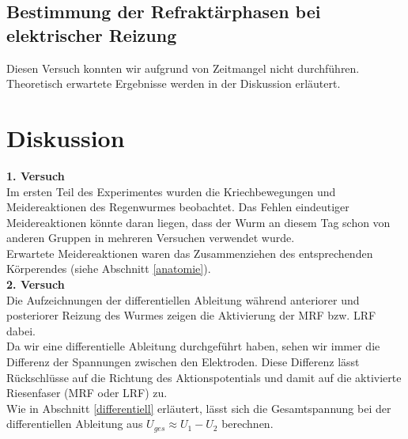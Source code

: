 \documentclass[11pt]{article}
\begin{document}

\subsection{Bestimmung der Refraktärphasen bei elektrischer Reizung}
Diesen Versuch konnten wir aufgrund von Zeitmangel nicht durchführen. Theoretisch erwartete Ergebnisse werden in der Diskussion erläutert.

\section{Diskussion}

\textbf{1. Versuch} \\
Im ersten Teil des Experimentes wurden die Kriechbewegungen und Meidereaktionen des Regenwurmes beobachtet. 
Das Fehlen eindeutiger Meidereaktionen könnte daran liegen, dass der Wurm an diesem Tag schon von anderen Gruppen in mehreren Versuchen verwendet wurde. \\
Erwartete Meidereaktionen waren das Zusammenziehen des entsprechenden Körperendes (siehe Abschnitt \ref{anatomie}). \\

\textbf{2. Versuch}\\
Die Aufzeichnungen der differentiellen Ableitung während anteriorer und posteriorer Reizung des Wurmes zeigen die Aktivierung der MRF bzw. LRF dabei. \\
Da wir eine differentielle Ableitung durchgeführt haben, sehen wir immer die Differenz der Spannungen zwischen den Elektroden. Diese Differenz lässt Rückschlüsse auf die Richtung des Aktionspotentials und damit auf die aktivierte Riesenfaser (MRF oder LRF) zu. \\
Wie in Abschnitt \ref{differentiell} erläutert, lässt sich die Gesamtspannung bei der differentiellen Ableitung aus $U_{ges} \approx U_1 - U_2$ berechnen. \\
\end{document}
